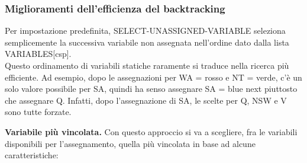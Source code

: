 \subsubsection{Miglioramenti dell'efficienza del backtracking}
Per impostazione predefinita, SELECT-UNASSIGNED-VARIABLE seleziona semplicemente la successiva variabile non assegnata nell'ordine dato dalla lista VARIABLES[csp].
\\Questo ordinamento di variabili statiche raramente si traduce nella ricerca più efficiente. Ad esempio, dopo le assegnazioni per WA = rosso e NT = verde, c'è un solo valore possibile per SA, quindi ha senso assegnare SA = blue next piuttosto che assegnare Q. Infatti, dopo l'assegnazione di SA, le scelte per Q, NSW e V sono tutte forzate.

\textbf{Variabile più vincolata.} Con questo approccio si va a scegliere, fra le variabili disponibili per l'assegnamento, quella più vincolata in base ad alcune caratteristiche:
